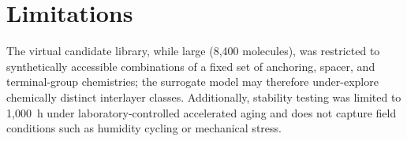 \section{Limitations}

The virtual candidate library, while large (8{,}400 molecules), was
restricted to synthetically accessible combinations of a fixed set of
anchoring, spacer, and terminal-group chemistries; the surrogate model
may therefore under-explore chemically distinct interlayer classes.
Additionally, stability testing was limited to 1{,}000~h under
laboratory-controlled accelerated aging and does not capture field
conditions such as humidity cycling or mechanical stress.
